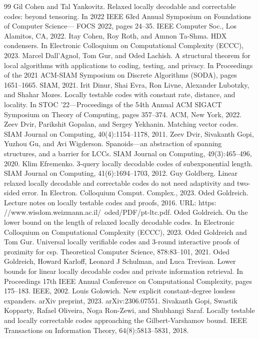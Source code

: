 \documentclass[10pt,a4paper]{article}
\begin{document}
\begin{thebibliography}{99}
 Gil Cohen and Tal Yankovitz. Relaxed locally decodable and correctable codes: beyond tensoring. In 2022 IEEE 63rd Annual Symposium on Foundations of Computer Science— FOCS 2022, pages 24–35. IEEE Computer Soc., Los Alamitos, CA, 2022.
 Itay Cohen, Roy Roth, and Amnon Ta-Shma. HDX condensers. In Electronic Colloquium on Computational Complexity (ECCC), 2023.
 Marcel Dall’Agnol, Tom Gur, and Oded Lachish. A structural theorem for local algorithms with applications to coding, testing, and privacy. In Proceedings of the 2021 ACM-SIAM Symposium on Discrete Algorithms (SODA), pages 1651–1665. SIAM, 2021.
 Irit Dinur, Shai Evra, Ron Livne, Alexander Lubotzky, and Shahar Mozes. Locally testable codes with constant rate, distance, and locality. In STOC ’22—Proceedings of the 54th Annual ACM SIGACT Symposium on Theory of Computing, pages 357–374. ACM, New York, 2022.
 Zeev Dvir, Parikshit Gopalan, and Sergey Yekhanin. Matching vector codes. SIAM Journal on Computing, 40(4):1154–1178, 2011.
 Zeev Dvir, Sivakanth Gopi, Yuzhou Gu, and Avi Wigderson. Spanoids—an abstraction of spanning structures, and a barrier for LCCs. SIAM Journal on Computing, 49(3):465–496, 2020.
 Klim Efremenko. 3-query locally decodable codes of subexponential length. SIAM Journal on Computing, 41(6):1694–1703, 2012.
 Guy Goldberg. Linear relaxed locally decodable and correctable codes do not need adaptivity and two-sided error. In Electron. Colloquium Comput. Complex., 2023.
 Oded Goldreich. Lecture notes on locally testable codes and proofs, 2016. URL: https: //www.wisdom.weizmann.ac.il/~oded/PDF/pt-ltc.pdf.
 Oded Goldreich. On the lower bound on the length of relaxed locally decodable codes. In Electronic Colloquium on Computational Complexity (ECCC), 2023.
 Oded Goldreich and Tom Gur. Universal locally verifiable codes and 3-round interactive proofs of proximity for csp. Theoretical Computer Science, 878:83–101, 2021.
 Oded Goldreich, Howard Karloff, Leonard J Schulman, and Luca Trevisan. Lower bounds for linear locally decodable codes and private information retrieval. In Proceedings 17th IEEE Annual Conference on Computational Complexity, pages 175–183. IEEE, 2002.
 Louis Golowich. New explicit constant-degree lossless expanders. arXiv preprint, 2023. arXiv:2306.07551.
 Sivakanth Gopi, Swastik Kopparty, Rafael Oliveira, Noga Ron-Zewi, and Shubhangi Saraf. Locally testable and locally correctable codes approaching the Gilbert-Varshamov bound. IEEE Transactions on Information Theory, 64(8):5813–5831, 2018.

\end{thebibliography}
\end{document}
